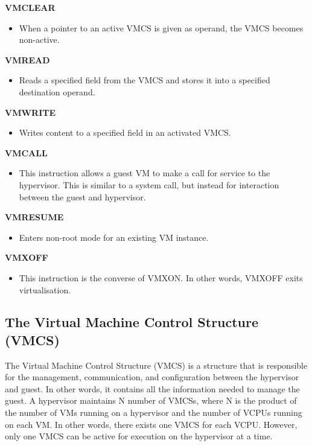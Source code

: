 \documentclass{report}
\begin{document}
\begin{spacing}{1.5}
{\textbf{VMCLEAR}
\begin{itemize}
\item[] {\large When a pointer to an active VMCS is given as operand, the VMCS becomes non-active. ~\cite{bhushanmodelling}}
\end{itemize}


\textbf{VMREAD}
\begin{itemize}
\item[] {\large Reads a specified field from the VMCS and stores it into a specified destination operand.}
\end{itemize}

\textbf{VMWRITE}
\begin{itemize}
\item[] {\large Writes content to a specified field in an activated VMCS.}
\end{itemize}

\textbf{VMCALL}
\begin{itemize}
\item[] {\large This instruction allows a guest VM to make a call for service to the hypervisor. This is similar to a system call, but instead for interaction between the guest and hypervisor.}
\end{itemize}

\textbf{VMRESUME}
\begin{itemize}
\item[] Enters non-root mode for an existing VM instance.
\end{itemize}


\textbf{VMXOFF}
\begin{itemize}
\item[] {\large This instruction is the converse of VMXON. In other words, VMXOFF exits virtualisation. }
\end{itemize}

\leavevmode\newline
}



\subsection{The Virtual Machine Control Structure (VMCS)}

{\large
The Virtual Machine Control Structure (VMCS) is a structure that is responsible for the management, communication, and configuration between the hypervisor and guest. In other words, it contains all the information needed to manage the guest. A hypervisor maintains N number of VMCSs, where N is the product of the number of VMs running on a hypervisor and the number of VCPUs running on each VM. In other words, there exists one VMCS for each VCPU. However, only one VMCS can be active for execution on the hypervisor at a time. 
\newline
}


\end{spacing}
\end{document}
